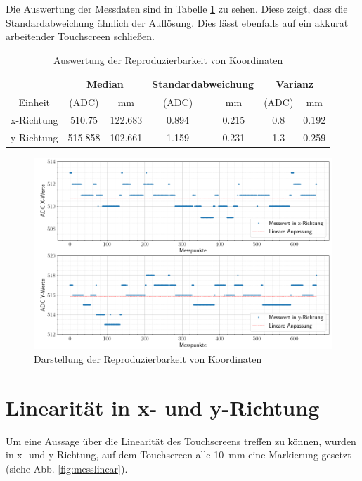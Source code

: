 Die Auswertung der Messdaten sind in Tabelle \ref{tab:wiederholung} zu sehen. 
Diese zeigt, dass die Standardabweichung ähnlich der Auflösung. Dies lässt ebenfalls auf ein akkurat arbeitender Touchscreen schließen.


\begin{table}[ht!]
    \caption{Auswertung der Reproduzierbarkeit von Koordinaten}
    \begin{center}
        \begin{tabular}{ |c|c|c|c|c|c|c| }
          \hline  
         &\multicolumn{2}{c|}{Median}& \multicolumn{2}{c|}{Standardabweichung}&\multicolumn{2}{c|}{Varianz} \\ \hline
         Einheit    &(ADC)              &mm             &(ADC)          &mm             &(ADC)          &mm\\\hline
         x-Richtung & \SI{510,75}{}    & \SI{122,683}{}&\SI{0,894}{}   &\SI{0,215}{}   &\SI{0,8}{}     & \SI{0,192}{} \\  \hline
         y-Richtung & \SI{515,858}{}    & \SI{102,661}{}&\SI{1,159}{}   &\SI{0,231}{}   &\SI{1,3}{}     & \SI{0,259}{} \\ \hline  
        \end{tabular}
        \label{tab:wiederholung}
    \end{center}   
\end{table}


\begin{figure}[ht!]
    \centering
    \includegraphics[width=\linewidth]{fig/wiederholung.png}
    \caption{Darstellung der Reproduzierbarkeit von Koordinaten}
    \label{fig:wiederholung}
\end{figure}
\section{Linearität in x- und y-Richtung}
\label{ab:linear}
Um eine Aussage über die Linearität des Touchscreens treffen zu können, wurden in x- und y-Richtung, auf dem Touchscreen alle \SI{10}{mm} eine Markierung gesetzt (siehe Abb. \ref{fig:messlinear}).

